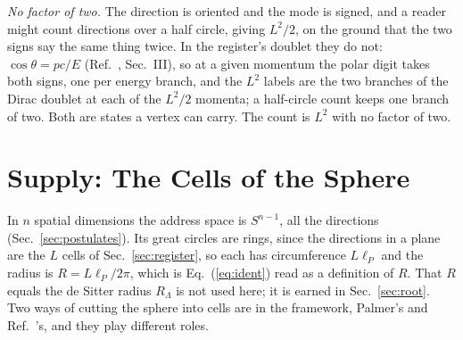 \documentclass[aps,prd,twocolumn,superscriptaddress,nofootinbib]{revtex4-2}
\begin{document}
\textit{No factor of two.} The direction is oriented and the mode is signed, and a reader might count directions over a half circle, giving $L^2/2$, on the ground that the two signs say the same thing twice. In the register's doublet they do not: $\cos\theta = pc/E$ (Ref.~\cite{korytko2026c}, Sec.~III), so at a given momentum the polar digit takes both signs, one per energy branch, and the $L^2$ labels are the two branches of the Dirac doublet at each of the $L^2/2$ momenta; a half-circle count keeps one branch of two. Both are states a vertex can carry. The count is $L^2$ with no factor of two.

\section{Supply: The Cells of the Sphere}
\label{sec:supply}

In $n$ spatial dimensions the address space is $S^{n-1}$, all the directions (Sec.~\ref{sec:postulates}). Its great circles are rings, since the directions in a plane are the $L$ cells of Sec.~\ref{sec:register}, so each has circumference $L\ell_P$ and the radius is $R = L\ell_P/2\pi$, which is Eq.~(\ref{eq:ident}) read as a definition of $R$. That $R$ equals the de Sitter radius $R_\Lambda$ is not used here; it is earned in Sec.~\ref{sec:root}. Two ways of cutting the sphere into cells are in the framework, Palmer's and Ref.~\cite{korytko2026}'s, and they play different roles.
\end{document}
